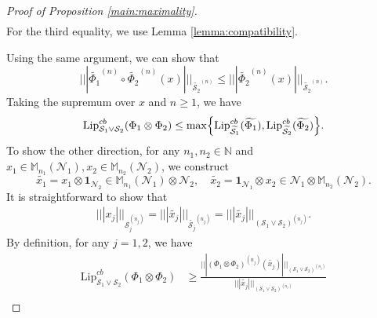 \documentclass[11pt,reqno]{amsart}
\numberwithin{equation}{section}
\newcommand{\mb}{\mathbb}
\newcommand{\wt}{\widetilde}
\newcommand{\mc}{\mathcal}
\newcommand{\Lip}{\mathrm{Lip}}
\newcommand{\pw}[1]{{\color{blue}[PW: #1]}}
\begin{document}
\begin{proof}[Proof of Proposition \ref{main:maximality}]
\begin{align*}
\end{align*}
For the third equality, we use Lemma \ref{lemma:compatibility}. 

Using the same argument, we can show that $$||| \wt{\Phi_1}^{(n)} \circ \wt{\Phi_2}^{(n)}(x)|||_{\wt{\mc S_2}^{(n)}} \le ||| \wt{\Phi_2}^{(n)}(x)|||_{\wt{\mc S_2}^{(n)}}.$$
Taking the supremum over $x$ and $n\ge 1$, we have 
\begin{align*}
     \Lip^{cb}_{\mc S_1 \vee \mc S_2}(\Phi_1 \otimes \Phi_2) \le \max\Bigl\{  \Lip_{\wt {\mc S_1}}^{cb}(\wt {\Phi_1}), \Lip_{\wt {\mc S_2}}^{cb}(\wt {\Phi_2})\Bigr\}.
\end{align*}
To show the other direction, for any $n_1,n_2 \in \mb N$ and $x_1 \in \mb M_{n_1}(\mc N_1), x_2 \in \mb M_{n_2}(\mc N_2)$, we construct 
\begin{equation}
    \wt{x_1} = x_1 \otimes \textbf{1}_{\mc N_2} \in \mb M_{n_1}(\mc N_1)  \otimes \mc N_2,\quad \wt{x_2} = \textbf{1}_{\mc N_1} \otimes x_2 \in \mc N_1 \otimes \mb M_{n_2}(\mc N_2).
\end{equation}
It is straightforward to show that 
\begin{align}\label{eqn:embed equality}
   |||x_j|||_{\mc S_j^{(n_j)}}= |||\wt{x_j}|||_{\wt{\mc S_j}^{(n_j)}} = |||\wt{x_j}|||_{(\mc S_1 \vee \mc S_2)^{(n_j)}}.
\end{align}
By definition, for any $j=1,2$, we have
\begin{align*}
    \Lip^{cb}_{\mc S_1 \vee \mc S_2}(\Phi_1 \otimes \Phi_2) &\ge \frac{|||(\Phi_1 \otimes \Phi_2)^{(n_j)}(\wt{x_j})|||_{(\mc S_1 \vee \mc S_2)^{(n_j)}}}{|||\wt{x_j}|||_{(\mc S_1 \vee \mc S_2)^{(n_j)}}} \\

\end{align*}
\end{proof}
\end{document}
